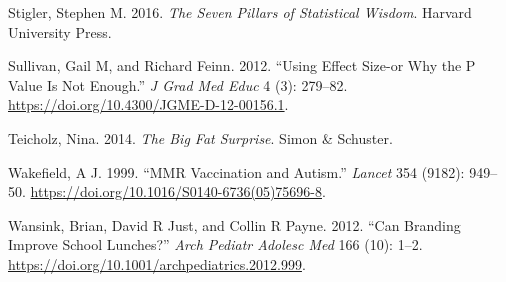 \documentclass[12pt,]{book}
\theoremstyle{definition}
\theoremstyle{definition}
\theoremstyle{definition}
\theoremstyle{remark}
\begin{document}
\leavevmode\hypertarget{ref-stig}{}%
Stigler, Stephen M. 2016. \emph{The Seven Pillars of Statistical Wisdom}. Harvard University Press.

\leavevmode\hypertarget{ref-Sullivan:2012ta}{}%
Sullivan, Gail M, and Richard Feinn. 2012. ``Using Effect Size-or Why the P Value Is Not Enough.'' \emph{J Grad Med Educ} 4 (3): 279--82. \url{https://doi.org/10.4300/JGME-D-12-00156.1}.

\leavevmode\hypertarget{ref-teic:2014}{}%
Teicholz, Nina. 2014. \emph{The Big Fat Surprise}. Simon \& Schuster.

\leavevmode\hypertarget{ref-wake:1999}{}%
Wakefield, A J. 1999. ``MMR Vaccination and Autism.'' \emph{Lancet} 354 (9182): 949--50. \url{https://doi.org/10.1016/S0140-6736(05)75696-8}.

\leavevmode\hypertarget{ref-wans:just:payn:2012}{}%
Wansink, Brian, David R Just, and Collin R Payne. 2012. ``Can Branding Improve School Lunches?'' \emph{Arch Pediatr Adolesc Med} 166 (10): 1--2. \url{https://doi.org/10.1001/archpediatrics.2012.999}.
\end{document}
